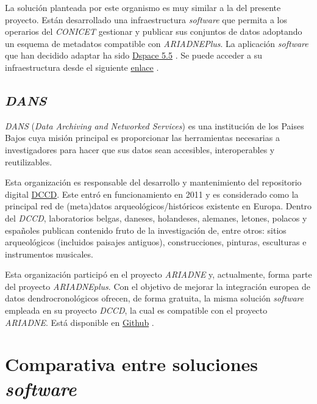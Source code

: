 La solución planteada por este organismo es muy similar a la del
presente proyecto. Están desarrollado una infraestructura
\emph{software} que permita a los operarios del \emph{CONICET} gestionar y
publicar sus conjuntos de datos adoptando un esquema de metadatos
compatible con \emph{ARIADNEPlus}. La aplicación \emph{software} que han
decidido adaptar ha sido \href{https://duraspace.org/dspace/}{Dspace
5.5} . Se puede acceder a su infraestructura desde el siguiente
\href{https://suquia.ffyh.unc.edu.ar/}{enlace} .

\subsection{\emph{DANS}}

\emph{DANS} \cite{dans:web} (\emph{Data Archiving and Networked Services}) 
es una institución de los Paises Bajos cuya misión principal es
proporcionar las herramientas necesarias a investigadores para hacer que
sus datos sean accesibles, interoperables y reutilizables.

Esta organización es responsable del desarrollo y mantenimiento del
repositorio digital \href{https://dendro.dans.knaw.nl/}{DCCD}. Este entró en funcionamiento en
2011 y es considerado como la principal red de (meta)datos
arqueológicos/históricos existente en Europa. Dentro del \emph{DCCD}, laboratorios belgas, daneses, holandeses,
alemanes, letones, polacos y españoles publican contenido fruto de la
investigación de, entre otros: sitios arqueológicos (incluidos paisajes
antiguos), construcciones, pinturas, esculturas e instrumentos
musicales.

Esta organización participó en el proyecto \emph{ARIADNE} y,
actualmente, forma parte del proyecto \emph{ARIADNEplus}. Con el
objetivo de mejorar la integración europea de datos dendrocronológicos
ofrecen, de forma gratuita, la misma solución \emph{software} empleada
en su proyecto \emph{DCCD}, la cual es compatible con el proyecto
\emph{ARIADNE}. Está disponible en
\href{https://github.com/DANS-KNAW/dccd-webui}{Github} .


\section{Comparativa entre soluciones \emph{software}}

